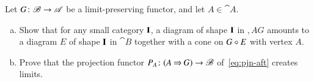 \begin{aquestion}
\label{ex:gaft-creates}
Let $G \from \cat{B} \to \cat{A}$ be a limit-preserving functor, and let $A
\in \cat{A}$.
%
\begin{enumerate}[(b)]
\item
Show that for any small category $\mathbf{I}$, a diagram of shape $\mathbf{I}$
in $\comma{A}{G}$ amounts to a diagram $E$ of shape $\mathbf{I}$ in $\cat{B}$
together with a cone on $G \mathbin{\circ} E$ with vertex $A$.

\item
\label{part:gaft-creates-creates}
Prove that the projection functor $P_A \from \comma{A}{G} \to \cat{B}$
of~\eqref{eq:pjn-aft} creates limits.%
%
%
%
\end{enumerate}
\end{aquestion}
